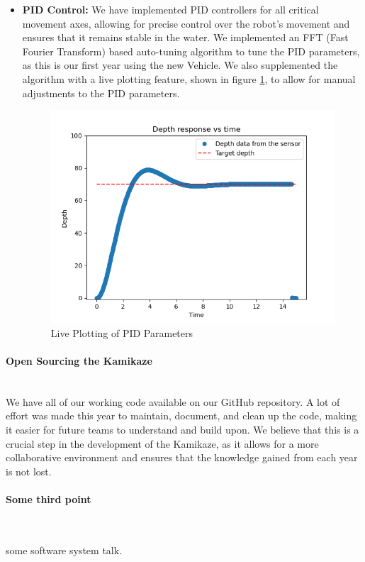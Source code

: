 \begin{itemize}[leftmargin=0pt, itemindent=10pt]
    \item \textbf{PID Control:} We have implemented PID controllers for all critical movement axes, allowing for precise control over the robot's movement and ensures that it remains stable in the water. We implemented an FFT (Fast Fourier Transform) based auto-tuning algorithm to tune the PID parameters, as this is our first year using the new Vehicle. We also supplemented the algorithm with a live
    plotting feature, shown in figure \ref{fig:pid_live}, to allow for manual adjustments to the PID parameters.
    \begin{figure}[h]
    \centering
    \includegraphics[width=\columnwidth]{Sections/2Design Rationale/images/Pid.png}
    \caption{Live Plotting of PID Parameters}
    \label{fig:pid_live}
    \end{figure}
\end{itemize}

\vspace{-1cm}
\paragraph{Open Sourcing the Kamikaze} \ \\
We have all of our working code available on our GitHub repository. A lot of effort was made this year to maintain, document, and clean up the code, making it easier for future teams to understand and build upon. We believe that this is a crucial step in the development of the Kamikaze, as it allows for a more collaborative environment and ensures that the knowledge gained from each year is not lost. 

\paragraph{Some third point} \ \\
\vspace{-0.5cm}

some software system talk.